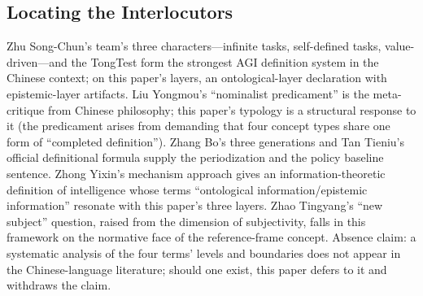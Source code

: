 \documentclass[10pt]{article}
\begin{document}
\subsection{Locating the Interlocutors}

Zhu Song-Chun's team's three characters---infinite tasks, self-defined tasks, value-driven---and the TongTest\cite{zhu2025tongtest,zhu2023origin,zhu2025moment} form the strongest AGI definition system in the Chinese context; on this paper's layers, an ontological-layer declaration with epistemic-layer artifacts. Liu Yongmou's ``nominalist predicament''\cite{liu2024complex} is the meta-critique from Chinese philosophy; this paper's typology is a structural response to it (the predicament arises from demanding that four concept types share one form of ``completed definition''). Zhang Bo's three generations\cite{zhang2020third} and Tan Tieniu's official definitional formula\cite{tan2024lecture} supply the periodization and the policy baseline sentence. Zhong Yixin's mechanism approach\cite{zhong2018mechanism} gives an information-theoretic definition of intelligence whose terms ``ontological information/epistemic information'' resonate with this paper's three layers. Zhao Tingyang's ``new subject'' question, raised from the dimension of subjectivity\cite{zhao2019selfconscious}, falls in this framework on the normative face of the reference-frame concept. Absence claim: a systematic analysis of the four terms' levels and boundaries does not appear in the Chinese-language literature; should one exist, this paper defers to it and withdraws the claim.
\end{document}
